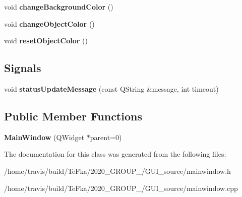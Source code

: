 \begin{DoxyCompactItemize}
\item 
void {\bfseries change\+Background\+Color} ()\hypertarget{class_main_window_a1a7e2b9194e7134bca5fcf1dd4842a07}{}\label{class_main_window_a1a7e2b9194e7134bca5fcf1dd4842a07}

\item 
void {\bfseries change\+Object\+Color} ()\hypertarget{class_main_window_a8f203aed440e1d68f244dec9f45cfadc}{}\label{class_main_window_a8f203aed440e1d68f244dec9f45cfadc}

\item 
void {\bfseries reset\+Object\+Color} ()\hypertarget{class_main_window_a17bfb1a5680150f099064be820b950a8}{}\label{class_main_window_a17bfb1a5680150f099064be820b950a8}

\end{DoxyCompactItemize}
\subsection*{Signals}
\begin{DoxyCompactItemize}
\item 
void {\bfseries status\+Update\+Message} (const Q\+String \&message, int timeout)\hypertarget{class_main_window_a86443ea744fda3e9bad328c2fd1c3d6b}{}\label{class_main_window_a86443ea744fda3e9bad328c2fd1c3d6b}

\end{DoxyCompactItemize}
\subsection*{Public Member Functions}
\begin{DoxyCompactItemize}
\item 
{\bfseries Main\+Window} (Q\+Widget $\ast$parent=0)\hypertarget{class_main_window_a8b244be8b7b7db1b08de2a2acb9409db}{}\label{class_main_window_a8b244be8b7b7db1b08de2a2acb9409db}

\end{DoxyCompactItemize}


The documentation for this class was generated from the following files\+:\begin{DoxyCompactItemize}
\item 
/home/travis/build/\+Te\+Fka/2020\+\_\+\+G\+R\+O\+U\+P\+\_/\+G\+U\+I\+\_\+source/mainwindow.\+h\item 
/home/travis/build/\+Te\+Fka/2020\+\_\+\+G\+R\+O\+U\+P\+\_/\+G\+U\+I\+\_\+source/mainwindow.\+cpp\end{DoxyCompactItemize}
